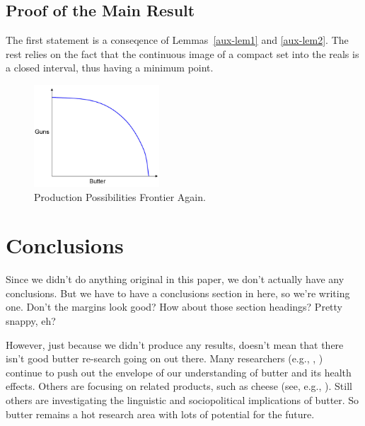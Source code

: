 \documentclass[mnsc,blindrev]{informs3} %
\begin{document}
\subsection{Proof of the Main Result}

 The first statement is a conseqence of
Lemmas~\ref{aux-lem1} and \ref{aux-lem2}. The rest relies on the fact that the continuous
image of a compact set into the reals is a closed interval, thus having
a minimum point.\Halmos 
\endproof

\begin{figure}[b]
\begin{center}
\includegraphics[height=1.5in]{Sample-Figure.pdf}
\caption{Production Possibilities Frontier Again.} \label{ECfrontier}
\end{center}
\end{figure}



\section{Conclusions}

Since we didn't do anything original in this paper, we don't
actually have any conclusions.  But we have to have a conclusions
section in here, so we're writing one.  Don't the margins look good?
How about those section headings?  Pretty snappy, eh?

However, just because we didn't produce any results, doesn't mean
that there isn't good butter re-search going on out there.  Many
researchers 
(e.g., \citealt{trbn}, \citealt{h})
continue to push out the envelope of our understanding of butter and
its health effects.  Others are focusing on related products, such as cheese 
(see, e.g., \citealt{fo}).  
Still others are
investigating the linguistic 
\citep{fs}
and sociopolitical 
\citep{g}
implications of butter.  So butter
remains a hot research area with lots of potential for the future.
\end{document}
